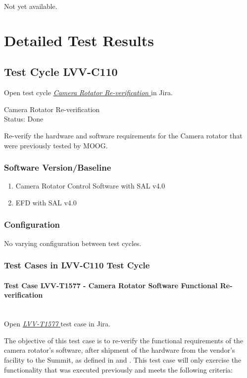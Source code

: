 \documentclass[SE,lsstdraft,STR,toc]{lsstdoc}
\providecommand{\tightlist}{
  \setlength{\itemsep}{0pt}\setlength{\parskip}{0pt}}
\begin{document}
Not yet available.

\newpage
\section{Detailed Test Results}
\label{sect:detailedtestresults}

\subsection{Test Cycle LVV-C110 }

Open test cycle {\it \href{https://jira.lsstcorp.org/secure/Tests.jspa#/testrun/LVV-C110}{Camera Rotator Re-verification
}} in Jira.

Camera Rotator Re-verification
\\
Status: Done

Re-verify the hardware and software requirements for the Camera rotator
that were previously tested by MOOG.


\subsubsection{Software Version/Baseline}
\begin{enumerate}
\tightlist
\item
  Camera Rotator Control Software with SAL v4.0
\item
  EFD with SAL v4.0
\end{enumerate}


\subsubsection{Configuration}
No varying configuration between test cycles.


\subsubsection{Test Cases in LVV-C110 Test Cycle}

\paragraph{Test Case LVV-T1577 - Camera Rotator Software Functional Re-verification
 }\mbox{}\\

Open  \href{https://jira.lsstcorp.org/secure/Tests.jspa#/testCase/LVV-T1577}{\textit{ LVV-T1577 } }
test case in Jira.

The objective of this test case is to re-verify the functional
requirements of the camera rotator's software, after shipment of the
hardware from the vendor's facility to the Summit, as defined in 
and . This test case will only exercise the functionality that
was executed previously and meets the following criteria:
\end{document}
